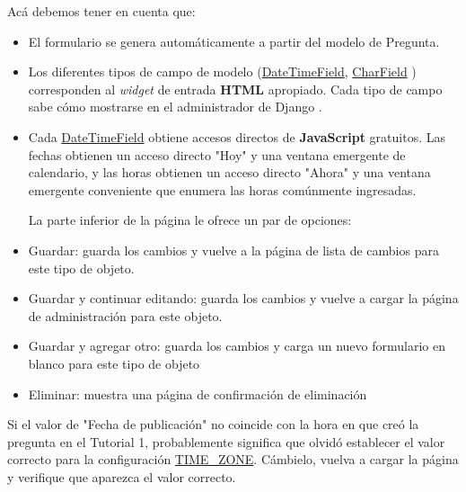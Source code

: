 \documentclass[10pt]{article}
\newcommand{\django}[1]{{\textcolor{G}{Django} #1}}
\begin{document}
Acá debemos tener en cuenta que:

\begin{itemize}
\item 
El formulario se genera automáticamente a partir del modelo de Pregunta.

\item 
Los diferentes tipos de campo de modelo ({\href{https://docs.djangoproject.com/en/3.0/ref/models/fields/\#django.db.models.DateTimeField}{\textcolor{B}{DateTimeField}}}, {\href{https://docs.djangoproject.com/en/3.0/ref/models/fields/\#django.db.models.CharField}{\textcolor{B}{CharField}}}
) corresponden al \textit{widget} de entrada \textbf{HTML} apropiado. Cada tipo de campo sabe cómo mostrarse en el administrador de \django{}.

\item
Cada {\href{https://docs.djangoproject.com/en/3.0/ref/models/fields/\#django.db.models.DateTimeField}{\textcolor{B}{DateTimeField}}} obtiene accesos directos de \textbf{JavaScript} gratuitos. Las fechas obtienen un acceso directo "Hoy" y una ventana emergente de calendario, y las horas obtienen un acceso directo "Ahora" y una ventana emergente conveniente que enumera las horas comúnmente ingresadas.


La parte inferior de la página le ofrece un par de opciones:

\item
Guardar: guarda los cambios y vuelve a la página de lista de cambios para este tipo de objeto.

\item
Guardar y continuar editando: guarda los cambios y vuelve a cargar la página de administración para este objeto.

\item
Guardar y agregar otro: guarda los cambios y carga un nuevo formulario en blanco para este tipo de objeto

\item
Eliminar: muestra una página de confirmación de eliminación

\end{itemize}


Si el valor de "Fecha de publicación" no coincide con la hora en que creó la pregunta en el Tutorial 1, probablemente significa que olvidó establecer el valor correcto para la configuración {\href{https://docs.djangoproject.com/en/3.0/ref/settings/\#std:setting-TIME\_ZONE}{\textcolor{B}{TIME\_ZONE}}}. Cámbielo, vuelva a cargar la página y verifique que aparezca el valor correcto.
\end{document}
